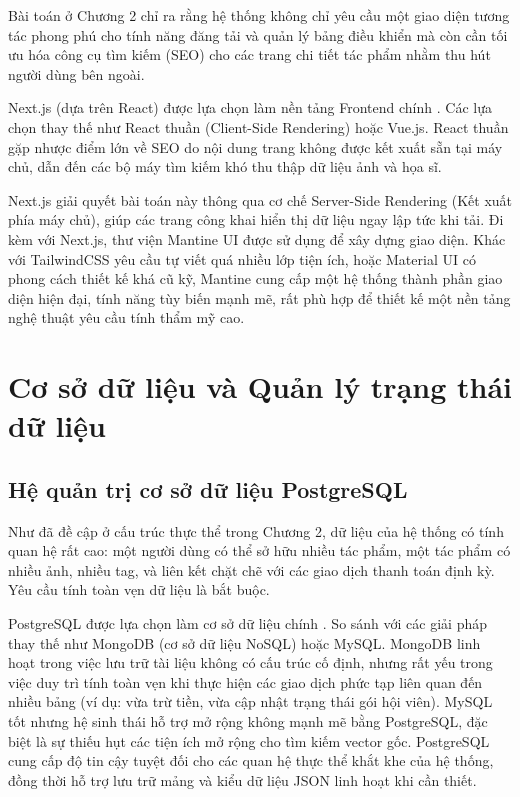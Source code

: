 Bài toán ở Chương 2 chỉ ra rằng hệ thống không chỉ yêu cầu một giao diện tương tác phong phú cho tính năng đăng tải và quản lý bảng điều khiển mà còn cần tối ưu hóa công cụ tìm kiếm (SEO) cho các trang chi tiết tác phẩm nhằm thu hút người dùng bên ngoài.

Next.js (dựa trên React) được lựa chọn làm nền tảng Frontend chính \cite{nextjs}. Các lựa chọn thay thế như React thuần (Client-Side Rendering) hoặc Vue.js. React thuần gặp nhược điểm lớn về SEO do nội dung trang không được kết xuất sẵn tại máy chủ, dẫn đến các bộ máy tìm kiếm khó thu thập dữ liệu ảnh và họa sĩ.

Next.js giải quyết bài toán này thông qua cơ chế Server-Side Rendering (Kết xuất phía máy chủ), giúp các trang công khai hiển thị dữ liệu ngay lập tức khi tải. Đi kèm với Next.js, thư viện Mantine UI được sử dụng để xây dựng giao diện. Khác với TailwindCSS yêu cầu tự viết quá nhiều lớp tiện ích, hoặc Material UI có phong cách thiết kế khá cũ kỹ, Mantine cung cấp một hệ thống thành phần giao diện hiện đại, tính năng tùy biến mạnh mẽ, rất phù hợp để thiết kế một nền tảng nghệ thuật yêu cầu tính thẩm mỹ cao.

\section{Cơ sở dữ liệu và Quản lý trạng thái dữ liệu}

\subsection{Hệ quản trị cơ sở dữ liệu PostgreSQL}

Như đã đề cập ở cấu trúc thực thể trong Chương 2, dữ liệu của hệ thống có tính quan hệ rất cao: một người dùng có thể sở hữu nhiều tác phẩm, một tác phẩm có nhiều ảnh, nhiều tag, và liên kết chặt chẽ với các giao dịch thanh toán định kỳ. Yêu cầu tính toàn vẹn dữ liệu là bắt buộc.

PostgreSQL được lựa chọn làm cơ sở dữ liệu chính \cite{postgresql}. So sánh với các giải pháp thay thế như MongoDB (cơ sở dữ liệu NoSQL) hoặc MySQL. MongoDB linh hoạt trong việc lưu trữ tài liệu không có cấu trúc cố định, nhưng rất yếu trong việc duy trì tính toàn vẹn khi thực hiện các giao dịch phức tạp liên quan đến nhiều bảng (ví dụ: vừa trừ tiền, vừa cập nhật trạng thái gói hội viên). MySQL tốt nhưng hệ sinh thái hỗ trợ mở rộng không mạnh mẽ bằng PostgreSQL, đặc biệt là sự thiếu hụt các tiện ích mở rộng cho tìm kiếm vector gốc. PostgreSQL cung cấp độ tin cậy tuyệt đối cho các quan hệ thực thể khắt khe của hệ thống, đồng thời hỗ trợ lưu trữ mảng và kiểu dữ liệu JSON linh hoạt khi cần thiết.

